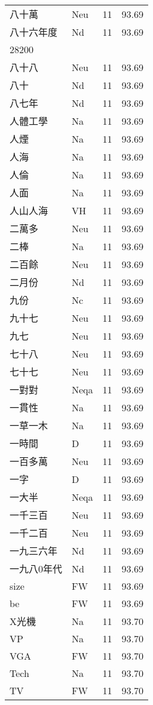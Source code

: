 \documentclass[twocolumn]{book}
\begin{document}
\begin{supertabular}{llrr}
八十萬 & Neu & 11 &  93.69\\
八十六年度 & Nd & 11 &  93.69\\
28200\\
八十八 & Neu & 11 &  93.69\\
八十 & Nd & 11 &  93.69\\
八七年 & Nd & 11 &  93.69\\
人體工學 & Na & 11 &  93.69\\
人煙 & Na & 11 &  93.69\\
人海 & Na & 11 &  93.69\\
人倫 & Na & 11 &  93.69\\
人面 & Na & 11 &  93.69\\
人山人海 & VH & 11 &  93.69\\
二萬多 & Neu & 11 &  93.69\\
二棒 & Na & 11 &  93.69\\
二百餘 & Neu & 11 &  93.69\\
二月份 & Nd & 11 &  93.69\\
九份 & Nc & 11 &  93.69\\
九十七 & Neu & 11 &  93.69\\
九七 & Neu & 11 &  93.69\\
七十八 & Neu & 11 &  93.69\\
七十七 & Neu & 11 &  93.69\\
一對對 & Neqa & 11 &  93.69\\
一貫性 & Na & 11 &  93.69\\
一草一木 & Na & 11 &  93.69\\
一時間 & D & 11 &  93.69\\
一百多萬 & Neu & 11 &  93.69\\
一字 & D & 11 &  93.69\\
一大半 & Neqa & 11 &  93.69\\
一千三百 & Neu & 11 &  93.69\\
一千二百 & Neu & 11 &  93.69\\
一九三六年 & Nd & 11 &  93.69\\
一九八0年代 & Nd & 11 &  93.69\\
size & FW & 11 &  93.69\\
be & FW & 11 &  93.69\\
X光機 & Na & 11 &  93.70\\
VP & Na & 11 &  93.70\\
VGA & FW & 11 &  93.70\\
Tech & Na & 11 &  93.70\\
TV & FW & 11 &  93.70\\

\end{supertabular}
\end{document}
